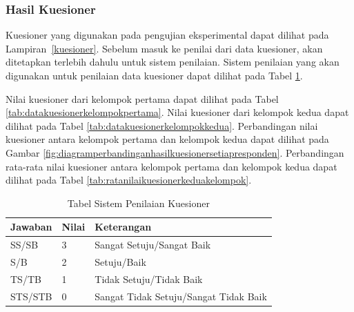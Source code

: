 \subsubsection{Hasil Kuesioner}
\label{sec:hasilkuesioner}

Kuesioner yang digunakan pada pengujian eksperimental dapat dilihat pada
Lampiran~\ref{kuesioner}. Sebelum masuk ke penilai dari data kuesioner, akan
ditetapkan terlebih dahulu untuk sistem penilaian. Sistem penilaian yang
akan digunakan untuk penilaian data kuesioner dapat dilihat pada Tabel
\ref{tab:sistempenilaian}.

Nilai kuesioner dari kelompok pertama dapat dilihat pada Tabel
\ref{tab:datakuesionerkelompokpertama}. Nilai kuesioner dari kelompok kedua
dapat dilihat pada Tabel \ref{tab:datakuesionerkelompokkedua}. Perbandingan
nilai kuesioner antara kelompok pertama dan kelompok kedua dapat dilihat pada
Gambar \ref{fig:diagramperbandinganhasilkuesionersetiapresponden}. Perbandingan
rata-rata nilai kuesioner antara kelompok pertama dan kelompok kedua dapat
dilihat pada Tabel \ref{tab:ratanilaikuesionerkeduakelompok}.

\begin{table}[h]
\centering
\caption[Tabel Sistem Penilaian Kuesioner]{Tabel Sistem Penilaian Kuesioner}
\label{tab:sistempenilaian}
\begin{tabular}{|l|l|l|}
\hline
Jawaban & Nilai & Keterangan\\
\hline
SS/SB & 3 & Sangat Setuju/Sangat Baik\\
\hline
S/B & 2 & Setuju/Baik\\
\hline
TS/TB & 1 & Tidak Setuju/Tidak Baik\\
\hline
STS/STB & 0 & Sangat Tidak Setuju/Sangat Tidak Baik\\
\hline
\end{tabular}
\end{table}

